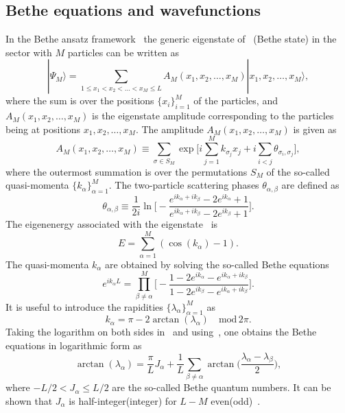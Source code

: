 \documentclass[11pt]{iopart}
\begin{document}
\subsection{Bethe equations and wavefunctions}
\label{sec:1.2}


In the Bethe ansatz framework~\cite{bethe-1931,taka-book} the generic eigenstate 
of~ (Bethe state) in the sector with $M$ particles can be written as 
%
\begin{equation}
\label{ba-eig}
|\Psi_M\rangle=\sum\limits_{1\le x_1<x_2<\dots<x_M\le L}A_M(x_1,x_2,
\dots,x_M)|x_1,x_2,\dots,x_M\rangle,
\end{equation}
%
where the sum is over the positions $\{x_i\}_{i=1}^M$ of the particles, and $A_M(x_1,
x_2,\dots,x_M)$ is the eigenstate amplitude corresponding to the particles 
being at positions $x_1,x_2,\dots, x_M$. The amplitude $A_M(x_1,x_2,\dots, x_M)$ is 
given as 
%
\begin{equation}
\label{ba_amp}
A_M(x_1,x_2,\dots,x_M)\equiv\sum\limits_{\sigma\in S_M}\exp\Big[i
\sum\limits_{j=1}^Mk_{\sigma_j}x_j+i\sum\limits_{i<j}\theta_{\sigma_i,\sigma_j}
\Big], 
\end{equation}
%
where the outermost summation is over the permutations $S_M$ of the so-called 
quasi-momenta $\{k_\alpha\}_{\alpha=1}^M$. The two-particle scattering phases 
$\theta_{\alpha,\beta}$ are defined as 
%
\begin{equation}
\label{s_phases}
\theta_{\alpha,\beta}\equiv \frac{1}{2i}\ln\Big[-\frac{e^{ik_\alpha+ik_\beta}-
2e^{ik_\alpha}+1}{e^{ik_\alpha+ik_\beta}-2e^{ik_\beta}+1}\Big].
\end{equation}
%
The eigenenergy associated with the eigenstate~ is  
%
\begin{equation}
\label{ba-ener}
E=\sum\limits_{\alpha=1}^M(\cos(k_\alpha)-1). 
\end{equation}
%
The quasi-momenta $k_\alpha$ are obtained by solving the so-called Bethe 
equations~\cite{bethe-1931}
%
\begin{equation}
\label{ba-eq}
e^{ik_\alpha L}=\prod\limits^M_{\beta\ne\alpha}\Big[-\frac{1-2e^{
ik_\alpha}-e^{ik_\alpha+ik_\beta}}{1-2e^{ik_\beta}-e^{ik_\alpha+
ik_\beta}}\Big].
\end{equation}
%
It is useful to  introduce the rapidities $\{\lambda_\alpha\}_{\alpha=1}^M$ as 
%
\begin{equation}
\label{rap}
k_\alpha=\pi-2\arctan(\lambda_\alpha)\quad\mbox{mod}\, 2\pi.
\end{equation}
%
Taking the logarithm on both sides in~ and using~, 
one obtains the Bethe equations in logarithmic form as 
%
\begin{equation}
\label{ba-eq-log}
\arctan(\lambda_\alpha)=\frac{\pi}{L}J_\alpha+\frac{1}{L}\sum\limits_{
\beta\ne\alpha}\arctan\Big(\frac{\lambda_\alpha-\lambda_\beta}{2}\Big),
\end{equation}
%
where $-L/2<J_\alpha\le L/2$ are the so-called Bethe quantum numbers. It can 
be shown that $J_\alpha$ is half-integer(integer) for $L-M$ even(odd)~\cite{taka-book}. 
\end{document}
